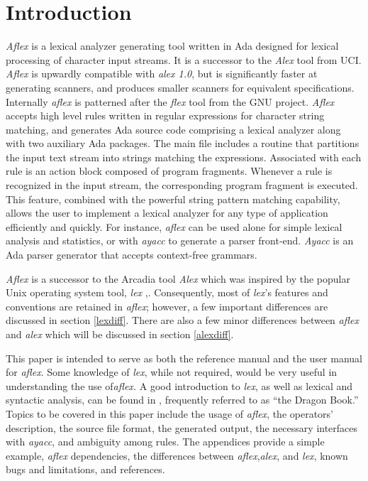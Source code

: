 \section{Introduction}
\label{intro}
{\sl Aflex} is a lexical analyzer generating tool written in Ada
designed for lexical 
processing of character input streams.
It is a successor to the {\sl Alex}\cite{alex} tool from UCI.  {\sl Aflex}
is upwardly compatible with {\sl alex 1.0}, but is significantly
faster at generating scanners, and produces smaller scanners for
equivalent specifications.  Internally {\sl aflex} is patterned after the
{\sl flex} tool from the GNU project.
{\sl Aflex} accepts high level rules  written in regular expressions
for character string matching, and generates Ada source code comprising a
lexical analyzer along with two auxiliary Ada packages.  The main file
includes a routine that partitions the input text stream into strings 
matching the expressions.  Associated with each rule is an 
action block composed of program fragments.  Whenever a rule is recognized 
in the input stream, the corresponding program fragment is executed.
This feature, combined with the powerful string pattern matching capability,
allows the user to implement a lexical analyzer for any type of application
efficiently and quickly.
For instance, {\sl aflex} can be used alone for simple lexical analysis and 
statistics, or with {\sl ayacc} \cite{ayacc} to generate a parser front-end.  
{\sl Ayacc} is an Ada parser generator that accepts context-free grammars.

\mysk
{\sl Aflex} is a successor to the Arcadia tool {\sl Alex}\cite{alex} which
was inspired by the popular Unix operating system tool, {\it lex} 
\cite{lex},.  Consequently, most of {\it lex}'s features and conventions are 
retained in {\sl aflex}; however, a few important differences are discussed 
in section \ref{lexdiff}.  There are also a few minor differences
between {\sl aflex} and {\sl alex} which will be discussed in
section \ref{alexdiff}.

\mysk
This paper is intended to serve as both the reference manual and the
user manual for {\sl aflex}.  Some knowledge of {\it lex}, while not
required, would be very useful in understanding the use of{\sl aflex.}
A good introduction to {\it lex}, as well as lexical and syntactic analysis, 
can be found in \cite{dragon}, frequently referred to as ``the Dragon Book.''
Topics to be covered in this paper include the usage of
{\sl aflex}, the operators' description, the source file format,
the generated output, the necessary interfaces with {\sl ayacc},
and ambiguity among rules.
The appendices provide a simple example, {\sl aflex} dependencies,
the differences between {\sl aflex},{\sl alex}, and {\it lex}, known bugs and
limitations, and references.

